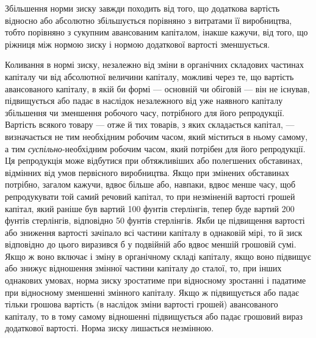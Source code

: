
Збільшення норми зиску завжди походить від того, що додаткова
вартість відносно або абсолютно збільшується порівняно
з витратами її виробництва, тобто порівняно з сукупним авансованим
капіталом, інакше кажучи, від того, що ріжниця між
нормою зиску і нормою додаткової вартості зменшується.

Коливання в нормі зиску, незалежно від зміни в органічних
складових частинах капіталу чи від абсолютної величини капіталу,
можливі через те, що вартість авансованого капіталу,
в якій би формі — основній чи обіговій — він не існував,
підвищується або падає в наслідок незалежного від уже наявного
капіталу збільшення чи зменшення робочого часу, потрібного
для його репродукції. Вартість всякого товару — отже
й тих товарів, з яких складається капітал, — визначається не
тим необхідним робочим часом, який міститься в ньому самому,
а тим \emph{суспільно}-необхідним робочим часом, який потрібен для
його репродукції. Ця репродукція може відбутися при обтяжливіших
або полегшених обставинах, відмінних від умов первісного
виробництва. Якщо при змінених обставинах потрібно,
загалом кажучи, вдвоє більше або, навпаки, вдвоє менше часу,
щоб репродукувати той самий речовий капітал, то при незміненій
вартості грошей капітал, який раніше був вартий 100 фунтів
стерлінгів, тепер буде вартий 200 фунтів стерлінгів, відповідно
50 фунтів стерлінгів. Якби це підвищення вартості або
зниження вартості зачіпало всі частини капіталу в однаковій
мірі, то й зиск відповідно до цього виразився б у подвійній
або вдвоє меншій грошовій сумі. Якщо ж воно включає і зміну
в органічному складі капіталу, якщо воно підвищує або знижує
відношення змінної частини капіталу до сталої, то, при інших
однакових умовах, норма зиску зростатиме при відносному
зростанні і падатиме при відносному зменшенні змінного капіталу.
Якщо ж підвищується або падає тільки грошова вартість
(в наслідок зміни вартості грошей) авансованого капіталу, то
в тому самому відношенні підвищується або падає грошовий вираз
додаткової вартості. Норма зиску лишається незмінною.
